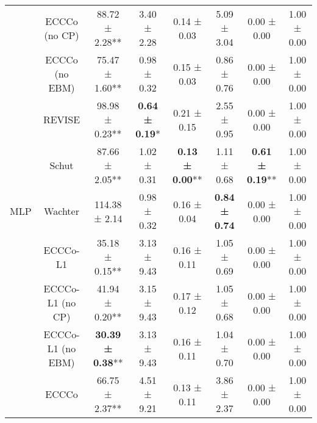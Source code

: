 \begin{table}
{\begin{tabular}[t]{cccccccc}
 & ECCCo (no CP) & 88.72 ± 2.28** & 3.40 ± 2.28\hphantom{*}\hphantom{*} & 0.14 ± 0.03\hphantom{*}\hphantom{*} & 5.09 ± 3.04\hphantom{*}\hphantom{*} & 0.00 ± 0.00\hphantom{*}\hphantom{*} & 1.00 ± 0.00\hphantom{*}\hphantom{*}\\

 & ECCCo (no EBM) & 75.47 ± 1.60** & 0.98 ± 0.32\hphantom{*}\hphantom{*} & 0.15 ± 0.03\hphantom{*}\hphantom{*} & 0.86 ± 0.76\hphantom{*}\hphantom{*} & 0.00 ± 0.00\hphantom{*}\hphantom{*} & 1.00 ± 0.00\hphantom{*}\hphantom{*}\\

 & REVISE & 98.98 ± 0.23** & \textbf{0.64 ± 0.19}*\hphantom{*} & 0.21 ± 0.15\hphantom{*}\hphantom{*} & 2.55 ± 0.95\hphantom{*}\hphantom{*} & 0.00 ± 0.00\hphantom{*}\hphantom{*} & 1.00 ± 0.00\hphantom{*}\hphantom{*}\\

 & Schut & 87.66 ± 2.05** & 1.02 ± 0.31\hphantom{*}\hphantom{*} & \textbf{0.13 ± 0.00}** & 1.11 ± 0.68\hphantom{*}\hphantom{*} & \textbf{0.61 ± 0.19}** & 1.00 ± 0.00\hphantom{*}\hphantom{*}\\

\multirow[t]{-10}{*}{\centering\arraybackslash MLP} & Wachter & 114.38 ± 2.14\hphantom{*}\hphantom{*} & 0.98 ± 0.32\hphantom{*}\hphantom{*} & 0.16 ± 0.04\hphantom{*}\hphantom{*} & \textbf{0.84 ± 0.74}\hphantom{*}\hphantom{*} & 0.00 ± 0.00\hphantom{*}\hphantom{*} & 1.00 ± 0.00\hphantom{*}\hphantom{*}\\
\cmidrule{1-8}
 & ECCCo-L1 & 35.18 ± 0.15** & 3.13 ± 9.43\hphantom{*}\hphantom{*} & 0.16 ± 0.11\hphantom{*}\hphantom{*} & 1.05 ± 0.69\hphantom{*}\hphantom{*} & 0.00 ± 0.00\hphantom{*}\hphantom{*} & 1.00 ± 0.00\hphantom{*}\hphantom{*}\\

 & ECCCo-L1 (no CP) & 41.94 ± 0.20** & 3.15 ± 9.43\hphantom{*}\hphantom{*} & 0.17 ± 0.12\hphantom{*}\hphantom{*} & 1.05 ± 0.68\hphantom{*}\hphantom{*} & 0.00 ± 0.00\hphantom{*}\hphantom{*} & 1.00 ± 0.00\hphantom{*}\hphantom{*}\\

 & ECCCo-L1 (no EBM) & \textbf{30.39 ± 0.38}** & 3.13 ± 9.43\hphantom{*}\hphantom{*} & 0.16 ± 0.11\hphantom{*}\hphantom{*} & 1.04 ± 0.70\hphantom{*}\hphantom{*} & 0.00 ± 0.00\hphantom{*}\hphantom{*} & 1.00 ± 0.00\hphantom{*}\hphantom{*}\\

 & ECCCo & 66.75 ± 2.37** & 4.51 ± 9.21\hphantom{*}\hphantom{*} & 0.13 ± 0.11\hphantom{*}\hphantom{*} & 3.86 ± 2.37\hphantom{*}\hphantom{*} & 0.00 ± 0.00\hphantom{*}\hphantom{*} & 1.00 ± 0.00\hphantom{*}\hphantom{*}\\


\end{tabular}}
\end{table}
